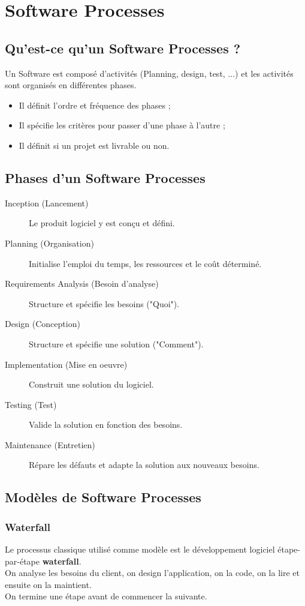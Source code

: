 \section{Software Processes}



\subsection{Qu'est-ce qu'un Software Processes ?}
Un Software est composé d'activités (Planning, design, test, ...) et les activités sont organisés en différentes phases.
\begin{itemize}
    \item Il définit l'ordre et fréquence des phases ;
    \item Il spécifie les critères pour passer d'une phase à l'autre ;
    \item Il définit si un projet est livrable ou non.
\end{itemize}



\subsection{Phases d'un Software Processes}
\begin{description}
    \item [Inception (Lancement)] Le produit logiciel y est conçu et défini.
    \item [Planning (Organisation)] Initialise l'emploi du temps, les ressources et le coût déterminé.
    \item [Requirements Analysis (Besoin d'analyse)] Structure et spécifie les besoins ("Quoi").
    \item [Design (Conception)] Structure et spécifie une solution ("Comment").
    \item [Implementation (Mise en oeuvre)] Construit une solution du logiciel.
    \item [Testing (Test)] Valide la solution en fonction des besoins.
    \item [Maintenance (Entretien)] Répare les défauts et adapte la solution aux nouveaux besoins.
\end{description}



\subsection{Modèles de Software Processes}
\subsubsection{Waterfall}
Le processus classique utilisé comme modèle est le développement logiciel étape-par-étape \textbf{waterfall}.
\\On analyse les besoins du client, on design l'application, on la code, on la lire et ensuite on la maintient.
\\On termine une étape avant de commencer la suivante.

